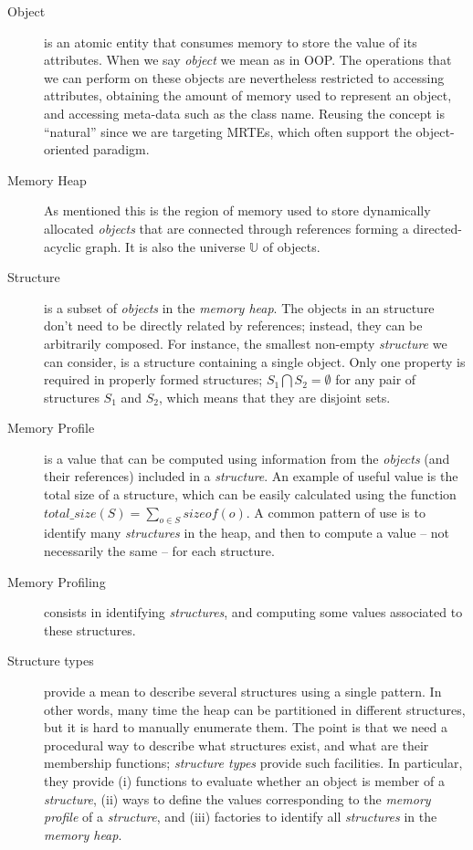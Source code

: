 \begin{description}
\item[Object] is an atomic entity that consumes memory to store the value of its attributes.
When we say \textit{object} we mean as in \gls{OOP}.
The operations that we can perform on these objects are nevertheless restricted to accessing attributes, obtaining the amount of memory used to represent an object, and accessing meta-data such as the class name.
Reusing the concept is ``natural'' since we are targeting MRTEs, which often support the object-oriented paradigm.

\item[Memory Heap] As mentioned this is the region of memory used to store dynamically allocated \textit{objects} that are connected through references forming a directed-acyclic graph.
It is also the universe $\mathbb{U}$ of objects.

\item[Structure] is a subset of \textit{objects} in the \textit{memory heap}.
The objects in an structure don't need to be directly related by references; instead, they can be arbitrarily composed.
For instance, the smallest non-empty \textit{structure} we can consider, is a structure containing a single object.
Only one property is required in properly formed structures;  $S_1 \bigcap S_2 = \emptyset$ for any pair of structures $S_1$ and $S_2$, which means that they are disjoint sets.

\item[Memory Profile] is a value that can be computed using information from the \textit{objects} (and their references) included in a \textit{structure}.
An example of useful value is the total size of a structure, which can be easily calculated using the function $\textit{total\_size}\left(S\right) = \sum_{o \in S} {sizeof(o)}$.
A common pattern of use is to identify many \textit{structures} in the heap, and then to compute a value -- not necessarily the same -- for each structure.

\item[Memory Profiling] consists in identifying \textit{structures}, and computing some values associated to these structures. 

\item[Structure types] provide a mean to describe several structures using a single pattern.
In other words, many time the heap can be partitioned in different structures, but it is hard to manually enumerate them.
The point is that we need a procedural way to describe what structures exist, and what are their membership functions; \textit{structure types} provide such facilities.
In particular, they provide (i) functions to evaluate whether an object is member of a \textit{structure}, (ii) ways to define the values corresponding to the \textit{memory profile} of a \textit{structure}, and (iii) factories to identify all \textit{structures} in the \textit{memory heap}.

\end{description}

